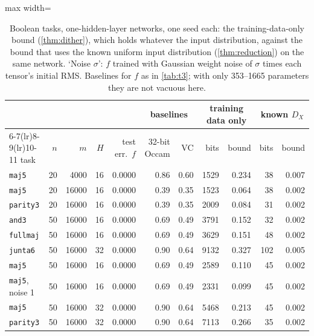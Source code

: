 \begin{table}[t]
\centering\small
\setlength{\tabcolsep}{4pt}
\begin{adjustbox}{max width=\linewidth}\begin{tabular}{l r r r r r r r r r r}
\toprule
 & & & & & \multicolumn{2}{c}{baselines} & \multicolumn{2}{c}{training data only} & \multicolumn{2}{c}{known $D_X$} \\
\cmidrule(lr){6-7}\cmidrule(lr){8-9}\cmidrule(lr){10-11}
task & $n$ & $m$ & $H$ & test err.\ $f$ & 32-bit Occam & VC & bits & bound & bits & bound \\
\midrule
\texttt{maj5} & 20 & 4000 & 16 & 0.0000 & 0.86 & 0.60 & 1529 & 0.234 & 38 & 0.007 \\
\texttt{maj5} & 20 & 16000 & 16 & 0.0000 & 0.39 & 0.35 & 1523 & 0.064 & 38 & 0.002 \\
\texttt{parity3} & 20 & 16000 & 16 & 0.0000 & 0.39 & 0.35 & 2009 & 0.084 & 31 & 0.002 \\
\texttt{and3} & 50 & 16000 & 16 & 0.0000 & 0.69 & 0.49 & 3791 & 0.152 & 32 & 0.002 \\
\texttt{fullmaj} & 50 & 16000 & 16 & 0.0000 & 0.69 & 0.49 & 3629 & 0.151 & 48 & 0.002 \\
\texttt{junta6} & 50 & 16000 & 32 & 0.0000 & 0.90 & 0.64 & 9132 & 0.327 & 102 & 0.005 \\
\texttt{maj5} & 50 & 16000 & 16 & 0.0000 & 0.69 & 0.49 & 2589 & 0.110 & 45 & 0.002 \\
\texttt{maj5}, noise 1 & 50 & 16000 & 16 & 0.0000 & 0.69 & 0.49 & 2331 & 0.099 & 45 & 0.002 \\
\texttt{maj5} & 50 & 16000 & 32 & 0.0000 & 0.90 & 0.64 & 5468 & 0.213 & 45 & 0.002 \\
\texttt{parity3} & 50 & 16000 & 32 & 0.0000 & 0.90 & 0.64 & 7113 & 0.266 & 35 & 0.002 \\
\bottomrule
\end{tabular}\end{adjustbox}
\caption{Boolean tasks, one-hidden-layer networks, one seed each: the training-data-only bound (\cref{thm:dither}), which holds whatever the input distribution, against the bound that uses the known uniform input distribution (\cref{thm:reduction}) on the same network. `Noise $\sigma$': $f$ trained with Gaussian weight noise of $\sigma$ times each tensor's initial RMS. Baselines for $f$ as in \cref{tab:t3}; with only 353--1665 parameters they are not vacuous here.}\label{tab:boolean_t3}
\end{table}

